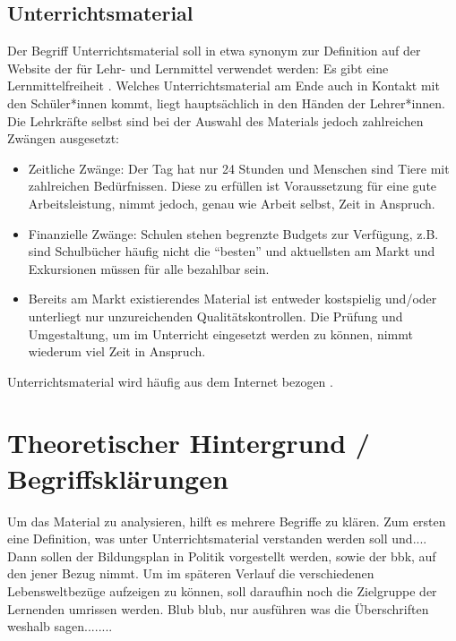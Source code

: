 \subsection{Unterrichtsmaterial}
Der Begriff Unterrichtsmaterial soll in etwa synonym zur Definition auf der Website der \textcite{KMKMittel} für Lehr- und Lernmittel verwendet werden: 
Es gibt eine Lernmittelfreiheit \autocite[]{KMKMittel}.
Welches Unterrichtsmaterial am Ende auch in Kontakt mit den Schüler*innen kommt, liegt hauptsächlich in den Händen der Lehrer*innen.
Die Lehrkräfte selbst sind bei der Auswahl des Materials jedoch zahlreichen Zwängen ausgesetzt:
\begin{itemize}
    \item Zeitliche Zwänge: Der Tag hat nur 24 Stunden und Menschen sind Tiere mit zahlreichen Bedürfnissen. Diese zu erfüllen ist Voraussetzung für eine gute Arbeitsleistung, nimmt jedoch, genau wie Arbeit selbst, Zeit in Anspruch. 
    \item Finanzielle Zwänge: Schulen stehen begrenzte Budgets zur Verfügung, z.B. sind Schulbücher häufig nicht die \enquote{besten} und aktuellsten am Markt und Exkursionen müssen für alle bezahlbar sein. 
    \item Bereits am Markt existierendes Material ist entweder kostspielig und/oder unterliegt nur unzureichenden Qualitätskontrollen. Die Prüfung und Umgestaltung, um im Unterricht eingesetzt werden zu können, nimmt wiederum viel Zeit in Anspruch. 
\end{itemize}

Unterrichtsmaterial wird häufig aus dem Internet bezogen \autocite[82]{Neumann2015}. %


\section{Theoretischer Hintergrund / Begriffsklärungen}
Um das Material zu analysieren, hilft es mehrere Begriffe zu klären. Zum ersten eine Definition, was unter Unterrichtsmaterial verstanden werden soll und.... %
Dann sollen der Bildungsplan in Politik vorgestellt werden, sowie der \gls{bbk}, auf den jener Bezug nimmt. Um im späteren Verlauf die verschiedenen Lebensweltbezüge aufzeigen zu können, soll daraufhin noch die Zielgruppe der Lernenden umrissen werden. 
Blub blub, nur ausführen was die Überschriften weshalb sagen........




